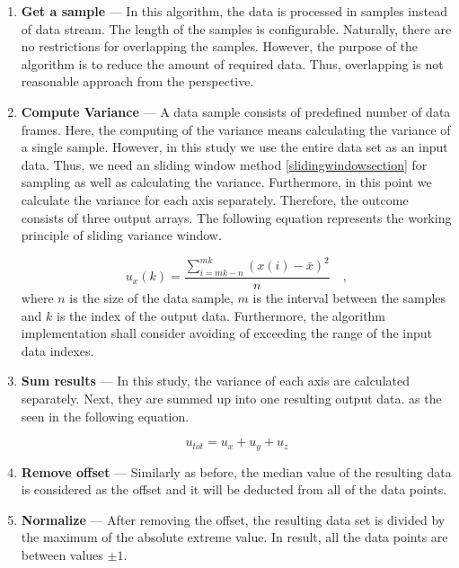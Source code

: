 \documentclass[english,12pt,a4paper,pdftex,elec,utf8]{aaltothesis}
\begin{document}
\begin{enumerate}

\item \textbf{Get a sample} --- In this algorithm, the data is processed in samples instead of data stream. The length of the samples is configurable. Naturally, there are no restrictions for overlapping the samples. However, the purpose of the algorithm is to reduce the amount of required data. Thus, overlapping is not reasonable approach from the perspective.

\item \textbf{Compute Variance} --- A data sample consists of predefined number of data frames. Here, the computing of the variance means calculating the variance of a single sample. However, in this study we use the entire data set as an input data. Thus, we need an sliding window method \ref{slidingwindowsection} for sampling as well as calculating the variance. Furthermore, in this point we calculate the variance for each axis separately. Therefore, the outcome consists of three output arrays. The following equation represents the working principle of sliding variance window.

\begin{equation} \label{samplevariance}
u_x(k) = \frac{\sum \limits_{i=mk-n}^{mk} (x(i) - \bar{x})^2}{n} \mathrm{\hspace{1em},}
\end{equation}
where $n$ is the size of the data sample, $m$ is the interval between the samples and $k$ is the index of the output data. Furthermore, the algorithm implementation shall consider avoiding of exceeding the range of the input data indexes.

\item \textbf{Sum results} --- In this study, the variance of each axis are calculated separately. Next, they are summed up into one resulting output data. as the seen in the following equation.

\begin{equation}
u_{tot} = u_x + u_y + u_z
\end{equation}

\item \textbf{Remove offset} --- Similarly as before, the median value of the resulting data is considered as the offset and it will be deducted from all of the data points.

\item \textbf{Normalize} --- After removing the offset, the resulting data set is divided by the maximum of the absolute extreme value. In result, all the data points are between values $\pm 1$.


\end{enumerate}
\end{document}
